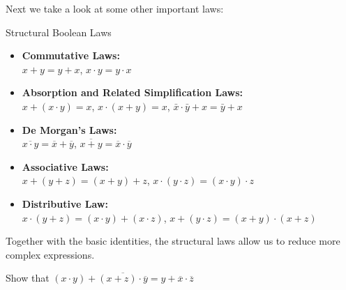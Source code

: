 Next we take a look at some other important laws:

\begin{custombox}{Structural Boolean Laws}
\begin{itemize}
    \item \textbf{Commutative Laws:} \\
    \hspace*{15pt}$x + y = y + x$, \quad $x \cdot y = y \cdot x$
    
    \item \textbf{Absorption and Related Simplification Laws:} \\
    \hspace*{15pt}$x + (x \cdot y) = x$, \quad $x \cdot (x + y) = x$, \quad $\bar{x} \cdot \bar{y}+x=\bar{y}+x$
    
    \item \textbf{De Morgan’s Laws:} \\
    \hspace*{15pt} $\overline{x \cdot y} = \overline{x} + \overline{y}$, \quad $\overline{x + y} = \overline{x} \cdot \overline{y}$
    \item \textbf{Associative Laws:} \\
    \hspace*{15pt} $x + (y + z) = (x + y) + z$, \quad $x \cdot (y \cdot z) = (x \cdot y) \cdot z$
    
    \item \textbf{Distributive Law:} \\
    \hspace*{15pt} $x \cdot (y + z) = (x \cdot y) + (x \cdot z)$, \quad $x + (y \cdot z) = (x + y) \cdot (x + z)$
\end{itemize}
\end{custombox}

Together with the basic identities, the structural laws allow us to reduce more complex expressions.

\begin{example}
    Show that
    \(
    (x \cdot y) + \overline{(x + z) \cdot \overline{y}} = y + \overline{x} \cdot \overline{z}
    \)
\end{example}

